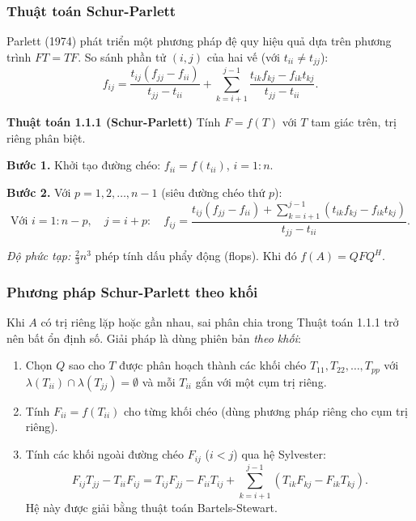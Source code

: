 \documentclass[12pt,a4paper]{report}
\begin{document}
\subsubsection{Thuật toán Schur-Parlett}

Parlett (1974) phát triển một phương pháp đệ quy hiệu quả dựa trên phương trình
$FT = TF$. So sánh phần tử $(i,j)$ của hai vế (với $t_{ii} \ne t_{jj}$):
\[
  f_{ij} = \frac{t_{ij}(f_{jj} - f_{ii})}{t_{jj} - t_{ii}}
           + \sum_{k=i+1}^{j-1} \frac{t_{ik} f_{kj} - f_{ik} t_{kj}}{t_{jj} - t_{ii}}.
\]

\begin{algobox}
\textbf{Thuật toán 1.1.1 (Schur-Parlett)} \quad Tính $F = f(T)$ với $T$ tam giác trên,
trị riêng phân biệt.

\medskip
\textbf{Bước 1.} Khởi tạo đường chéo: $f_{ii} = f(t_{ii})$, $i = 1:n$.

\textbf{Bước 2.} Với $p = 1, 2, \ldots, n-1$ (siêu đường chéo thứ $p$):
\[
  \text{Với } i = 1:n-p,\quad j = i+p:
  \quad
  f_{ij} = \frac{t_{ij}(f_{jj}-f_{ii}) + \sum_{k=i+1}^{j-1}(t_{ik}f_{kj} - f_{ik}t_{kj})}{t_{jj} - t_{ii}}.
\]

\medskip
\textit{Độ phức tạp:} $\tfrac{2}{3}n^3$ phép tính dấu phẩy động (flops).
Khi đó $f(A) = Q F Q^H$.
\end{algobox}

\subsubsection{Phương pháp Schur-Parlett theo khối}

Khi $A$ có trị riêng lặp hoặc gần nhau, sai phân chia trong Thuật toán 1.1.1 trở
nên bất ổn định số. Giải pháp là dùng phiên bản \emph{theo khối}:

\begin{enumerate}
  \item Chọn $Q$ sao cho $T$ được phân hoạch thành các khối chéo
        $T_{11}, T_{22}, \ldots, T_{pp}$ với $\lambda(T_{ii}) \cap \lambda(T_{jj}) = \emptyset$
        và mỗi $T_{ii}$ gắn với một cụm trị riêng.
  \item Tính $F_{ii} = f(T_{ii})$ cho từng khối chéo (dùng phương pháp riêng cho
        cụm trị riêng).
  \item Tính các khối ngoài đường chéo $F_{ij}$ ($i < j$) qua hệ Sylvester:
        \[
          F_{ij}T_{jj} - T_{ii}F_{ij} = T_{ij}F_{jj} - F_{ii}T_{ij}
          + \sum_{k=i+1}^{j-1}(T_{ik}F_{kj} - F_{ik}T_{kj}).
        \]
        Hệ này được giải bằng thuật toán Bartels-Stewart.
\end{enumerate}
\end{document}
